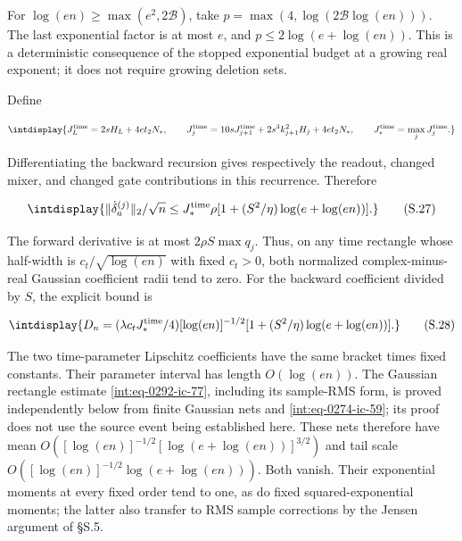 
For \(\log(en)\ge\max(e^2,\allowbreak 2\mathcal B)\), take \(p=\max(4,\allowbreak \log(2\mathcal B\log(en)))\). The last exponential factor is at most \(e\), and \(p\le2\log(e+\log(en))\). This is a deterministic consequence of the stopped exponential budget at a growing real exponent; it does not require growing deletion sets.



Define


\begingroup\renewcommand{\theHequation}{intdisplay.411}
\begin{equation*}
\intdisplay{
J_L^{\rm time}=2sH_L+4et_2N_*,\qquad
J_j^{\rm time}=10sJ_{j+1}^{\rm time}
                    +2s^3k_{j+1}^2H_j+4et_2N_*,\qquad
J_*^{\rm time}=\max_jJ_j^{\rm time}.
}
\end{equation*}
\endgroup


Differentiating the backward recursion gives respectively the readout, changed mixer, and changed gate contributions in this recurrence. Therefore


\begingroup\renewcommand{\theHequation}{intdisplay.412}
\begin{equation}
\intdisplay{
\|\dot\delta_a^{(j)}\|_2/\sqrt n
\le J_*^{\rm time}\rho
       [1+(S^2/\eta)\log(e+\log(en))].
}
\tag{S.27}
\label{int:eq-0201-s-27}
\end{equation}
\endgroup


The forward derivative is at most \(2\rho S\max q_j\). Thus, on any time rectangle whose half-width is \(c_t/\sqrt{\log(en)}\) with fixed \(c_t>0\), both normalized complex-minus-real Gaussian coefficient radii tend to zero. For the backward coefficient divided by \(S\), the explicit bound is


\begingroup\renewcommand{\theHequation}{intdisplay.413}
\begin{equation}
\intdisplay{
D_n=(\lambda c_tJ_*^{\rm time}/4)[\log(en)]^{-1/2}
                     [1+(S^2/\eta)\log(e+\log(en))].
}
\tag{S.28}
\label{int:eq-0202-s-28}
\end{equation}
\endgroup


The two time-parameter Lipschitz coefficients have the same bracket times fixed constants. Their parameter interval has length \(O(\log(en))\). The Gaussian rectangle estimate \eqref{int:eq-0292-ic-77}, including its sample-RMS form, is proved independently below from finite Gaussian nets and \eqref{int:eq-0274-ic-59}; its proof does not use the source event being established here. These nets therefore have mean \(O([\log(en)]^{-1/2}[\log(e+\log(en))]^{3/2})\) and tail scale \(O([\log(en)]^{-1/2}\log(e+\log(en)))\). Both vanish. Their exponential moments at every fixed order tend to one, as do fixed squared-exponential moments; the latter also transfer to RMS sample corrections by the Jensen argument of §S.5.


